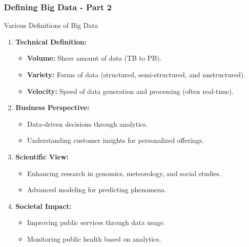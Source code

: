 \documentclass[aspectratio=169]{beamer}
\begin{document}
\begin{frame}[fragile]
    \frametitle{Defining Big Data - Part 2}
    \begin{block}{Various Definitions of Big Data}
        \begin{enumerate}
            \item \textbf{Technical Definition:}
            \begin{itemize}
                \item \textbf{Volume:} Sheer amount of data (TB to PB).
                \item \textbf{Variety:} Forms of data (structured, semi-structured, and unstructured).
                \item \textbf{Velocity:} Speed of data generation and processing (often real-time).
            \end{itemize}
            \pause
            \item \textbf{Business Perspective:}
            \begin{itemize}
                \item Data-driven decisions through analytics.
                \item Understanding customer insights for personalized offerings.
            \end{itemize}
            \pause
            \item \textbf{Scientific View:}
            \begin{itemize}
                \item Enhancing research in genomics, meteorology, and social studies.
                \item Advanced modeling for predicting phenomena.
            \end{itemize}
            \pause
            \item \textbf{Societal Impact:}
            \begin{itemize}
                \item Improving public services through data usage.
                \item Monitoring public health based on analytics.
            \end{itemize}
        \end{enumerate}
    \end{block}
\end{frame}
\end{document}
